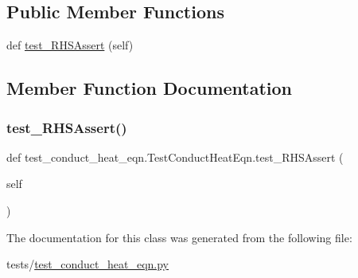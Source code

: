 \subsection*{Public Member Functions}
\begin{DoxyCompactItemize}
\item 
def \hyperlink{classtest__conduct__heat__eqn_1_1TestConductHeatEqn_a326c887d8fa7371718873e4818b5a9df}{test\+\_\+\+R\+H\+S\+Assert} (self)
\end{DoxyCompactItemize}


\subsection{Member Function Documentation}
\mbox{\label{classtest__conduct__heat__eqn_1_1TestConductHeatEqn_a326c887d8fa7371718873e4818b5a9df}} 
\subsubsection{\texorpdfstring{test\+\_\+\+R\+H\+S\+Assert()}{test\_RHSAssert()}}
{\footnotesize\ttfamily def test\+\_\+conduct\+\_\+heat\+\_\+eqn.\+Test\+Conduct\+Heat\+Eqn.\+test\+\_\+\+R\+H\+S\+Assert (\begin{DoxyParamCaption}\item[{}]{self }\end{DoxyParamCaption})}



The documentation for this class was generated from the following file\+:\begin{DoxyCompactItemize}
\item 
tests/\hyperlink{test__conduct__heat__eqn_8py}{test\+\_\+conduct\+\_\+heat\+\_\+eqn.\+py}\end{DoxyCompactItemize}
